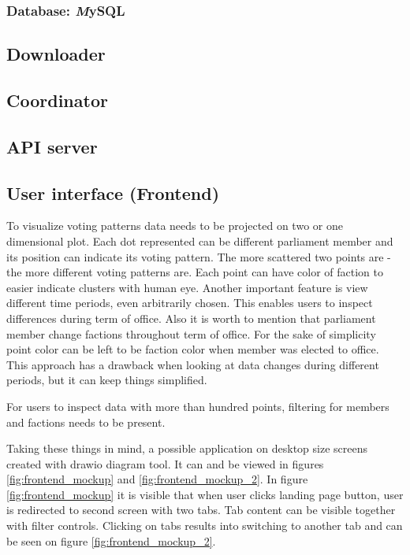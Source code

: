 \documentclass[a4paper,12pt]{article}
\begin{document}
    
    \subsubsection{Database: {\textit MySQL}}
    \subsection{Downloader}
    \subsection{Coordinator}
    \subsection{API server}
	\clearpage

    \subsection{User interface (Frontend)}
    
     To visualize voting patterns data needs to be projected on two or one dimensional plot. Each dot represented can be different parliament member and its position can indicate its voting pattern. The more scattered two points are - the more different voting patterns are. Each point can have color of faction to easier indicate clusters with human eye. Another important feature is view different time periods, even arbitrarily chosen. This enables users to inspect differences during term of office.   
    Also it is worth to mention that parliament member change factions throughout term of office. For the sake of simplicity point color can be left to be faction color when member was elected to office. This approach has a drawback when looking at data changes during different periods, but it can keep things simplified.
    
    For users to inspect data with more than hundred points, filtering for members and factions needs to be present.
    
    Taking these things in mind, a possible application on desktop size screens created with \gls{drawio} diagram tool. It can and be viewed in figures \ref{fig:frontend_mockup} and \ref{fig:frontend_mockup_2}. In figure \ref{fig:frontend_mockup} it is visible that  when user clicks landing page button, user is redirected to second screen with two tabs. Tab content can be visible together with filter controls. Clicking on tabs results into switching to another tab and can be seen on figure \ref{fig:frontend_mockup_2}.
    
\end{document}
